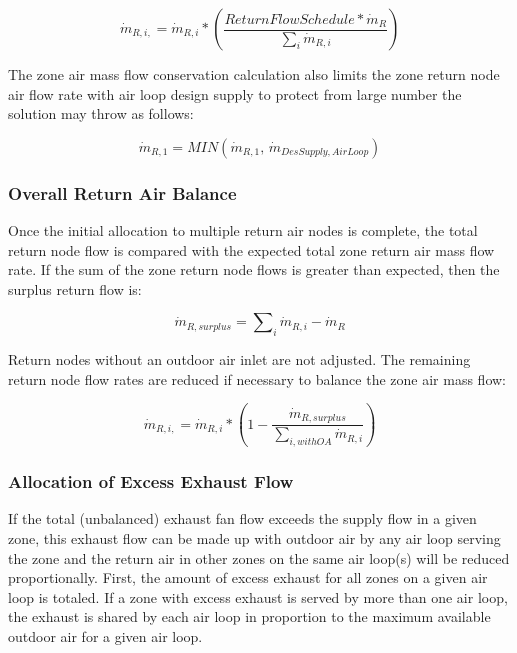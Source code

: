 \begin{equation}
{\dot m_{R,i,}} = {\dot m_{R,i}} * \left(\frac{ReturnFlowSchedule*{\dot m_{R}}} {\sum\nolimits_{i} {{{\dot m}_{R,i}}}} \right) 
\end{equation}

The zone air mass flow conservation calculation also limits the zone return node air flow rate with air loop design supply to protect from large number the solution may throw as follows:

\begin{equation}
{\dot m_{R,1}} = MIN\left( {{\dot m_{R,1}},\,{{\dot m}_{DesSupply, AirLoop}}} \right) 
\end{equation}
 

\subsubsection{Overall Return Air Balance}\label{overall-return-air-balance}

Once the initial allocation to multiple return air nodes is complete, the total return node flow is compared with the expected total zone return air mass flow rate. If the sum of the zone return node flows is greater than expected, then the surplus return flow is:

\begin{equation}
{\dot m_{R,surplus}} = \sum\nolimits_i {{{\dot m}_{R,i}}} - {\dot m_{R}}
\end{equation}

Return nodes without an outdoor air inlet are not adjusted. The remaining return node flow rates are reduced if necessary to balance the zone air mass flow:

\begin{equation}
{\dot m_{R,i,}} = {\dot m_{R,i}} * \left( 1 - \frac{\dot m_{R,surplus}} {\sum\nolimits_{i,withOA} {{{\dot m}_{R,i}}}} \right) 
\end{equation}

\subsubsection{Allocation of Excess Exhaust Flow}\label{allocation-of-excess-exhaust-flow}

If the total (unbalanced) exhaust fan flow exceeds the supply flow in a given zone, this exhaust flow can be made up with outdoor air by any air loop serving the zone and the return air in other zones on the same air loop(s) will be reduced proportionally. First, the amount of excess exhaust for all zones on a given air loop is totaled.  If a zone with excess exhaust is served by more than one air loop, the exhaust is shared by each air loop in proportion to the maximum available outdoor air for a given air loop.

